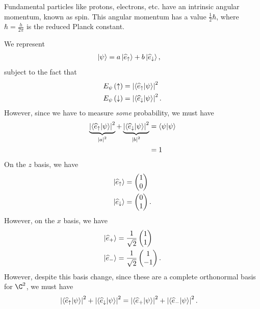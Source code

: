 \documentclass[10pt]{mypackage}
\begin{document}
\begin{example}
  Fundamental particles like protons, electrons, etc. have an intrinsic angular momentum, known as spin. This angular momentum has a value $\frac{1}{2}\hbar$, where $\hbar = \frac{h}{2\pi}$ is the reduced Planck constant.\newline

  We represent
  \begin{align*}
    \ket{\psi} &= a\ket{\widehat{e}_{\uparrow}} + b\ket{\widehat{e}_{\downarrow}},
  \end{align*}
  subject to the fact that
  \begin{align*}
    E_{\psi}\left(\uparrow\right) &= \left\vert \braket{\widehat{e}_{\uparrow}}{\psi} \right\vert^2\\
    E_{\psi}\left(\downarrow\right) &= \left\vert \braket{\widehat{e}_{\downarrow}}{\psi} \right\vert^2.
  \end{align*}
  However, since we have to measure \textit{some} probability, we must have
  \begin{align*}
    \underbrace{\left\vert \braket{\widehat{e}_{\uparrow}}{\psi} \right\vert^2}_{\left\vert a \right\vert^2} + \underbrace{\left\vert \braket{\widehat{e}_{\downarrow}}{\psi} \right\vert^2}_{\left\vert b \right\vert^2} &= \braket{\psi}{\psi}\\
                                                                                                                              &= 1
  \end{align*}
  On the $z$ basis, we have
  \begin{align*}
    \ket{\widehat{e}_{\uparrow}} &= \begin{pmatrix}1\\0\end{pmatrix}\\
    \ket{\widehat{e}_{\downarrow}} &= \begin{pmatrix}0\\1\end{pmatrix}.
  \end{align*}
  However, on the $x$ basis, we have
  \begin{align*}
    \ket{\widehat{e}_{+}} &= \frac{1}{\sqrt{2}}\begin{pmatrix}1\\1\end{pmatrix}\\
    \ket{\widehat{e}_{-}} &= \frac{1}{\sqrt{2}}\begin{pmatrix}1\\-1\end{pmatrix}.
  \end{align*}
  However, despite this basis change, since these are a complete orthonormal basis for $\C^2$, we must have
  \begin{align*}
    \left\vert \braket{\widehat{e}_{\uparrow}}{\psi} \right\vert^2 + \left\vert \braket{\widehat{e}_{\downarrow}}{\psi} \right\vert^2 &= \left\vert \braket{\widehat{e}_{+}}{\psi} \right\vert^2 + \left\vert \braket{\widehat{e}_{-}}{\psi} \right\vert^2.
  \end{align*}
\end{example}
\end{document}
